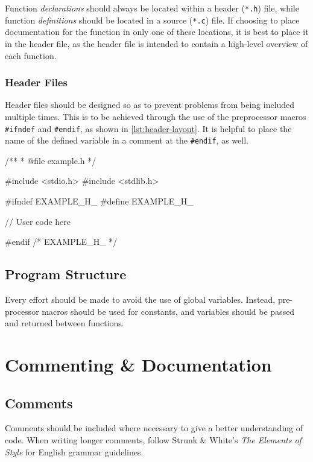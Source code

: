 \documentclass[11pt]{book}
\begin{document}
Function \emph{declarations} should always be located within a header
(\texttt{*.h}) file, while function \emph{definitions} should be located
in a source (\texttt{*.c}) file. If choosing to place documentation for
the function in only one of these locations, it is best to place it in
the header file, as the header file is intended to contain a high-level
overview of each function.

\subsection{Header Files}\label{subsec:header-files}

Header files should be designed so as to prevent problems from being included
multiple times. This is to be achieved through the use of the preprocessor macros
\texttt{\#ifndef} and \texttt{\#endif}, as shown in \autoref{lst:header-layout}.
It is helpful to place the name of the defined variable in a comment at the
\texttt{\#endif}, as well.

\begin{code}[caption=Example of header file layout.,label=lst:header-layout]
/**
 * @file example.h
 */
 
#include <stdio.h>
#include <stdlib.h>

#ifndef EXAMPLE_H_
#define EXAMPLE_H_

// User code here

#endif /* EXAMPLE_H_ */
\end{code}

\section{Program Structure}\label{sec:program-structure}

Every effort should be made to avoid the use of global variables.
Instead, pre-processor macros should be used for constants, and
variables should be passed and returned between functions.

\chapter{Commenting \& Documentation}\label{commenting-documentation}

\section{Comments}\label{comments}

Comments should be included where necessary to give a better
understanding of code. When writing longer comments, follow Strunk \&
White's \emph{The Elements of Style} for English grammar guidelines.
\end{document}
